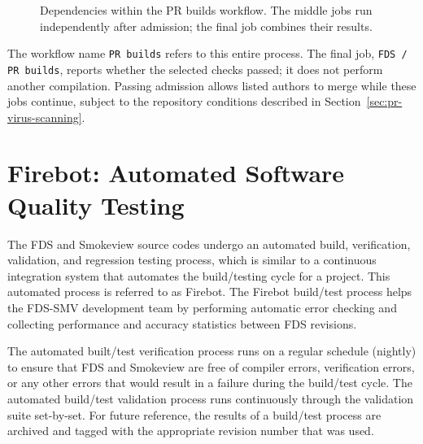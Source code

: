 \documentclass[11pt]{book}
\begin{document}
\begin{figure}[htbp]
\centering
{}
\caption[PR build dependencies]{Dependencies within the PR builds workflow. The middle jobs run independently after admission; the final job combines their results.}
\label{fig:pr-build-dependencies}
\end{figure}

The workflow name \texttt{PR builds} refers to this entire process. The final job, \texttt{FDS / PR builds}, reports whether the selected checks passed; it does not perform another compilation. Passing admission allows listed authors to merge while these jobs continue, subject to the repository conditions described in Section~\ref{sec:pr-virus-scanning}.

\section{Firebot: Automated Software Quality Testing}

The FDS and Smokeview source codes undergo an automated build, verification, validation, and regression testing process, which is similar to a continuous integration system that automates the build/testing cycle for a project. This automated process is referred to as Firebot. The Firebot build/test process helps the FDS-SMV development team by performing automatic error checking and collecting performance and accuracy statistics between FDS revisions.

The automated built/test verification process runs on a regular schedule (nightly) to ensure that FDS and Smokeview are free of compiler errors, verification errors, or any other errors that would result in a failure during the build/test cycle. The automated build/test validation process runs continuously through the validation suite set-by-set. For future reference, the results of a build/test process are archived and tagged with the appropriate revision number that was used.
\end{document}
